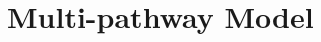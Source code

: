 \documentclass[10pt]{article}
\theoremstyle{definition}
\newcommand{\tuta}{\emph{T.~absoluta}}
\begin{document}
\section{Multi-pathway Model}
\end{document}

